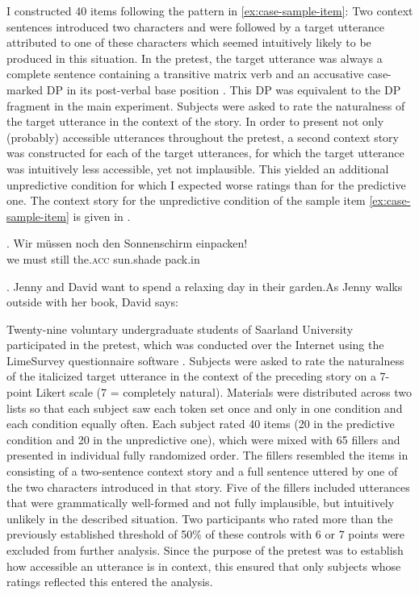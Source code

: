I constructed 40 items following the pattern in \ref{ex:case-sample-item}: Two context sentences introduced two characters and were followed by a target utterance attributed to one of these characters which seemed intuitively likely to be produced in this situation. In the pretest, the target utterance was always a complete sentence containing a transitive matrix verb and an accusative case-marked DP in its post-verbal base position \Next. This DP was equivalent to the DP fragment in the main experiment. Subjects were asked to rate the naturalness of the target utterance in the context of the story. In order to present not only (probably) accessible utterances throughout the pretest, a second context story was constructed for each of the target utterances, for which the target utterance was intuitively less accessible, yet not implausible. This yielded an additional unpredictive condition for which I expected worse ratings than for the predictive one. The context story for the unpredictive condition of the sample item \ref{ex:case-sample-item} is given in \NNext. 

\exg. Wir müssen noch den Sonnenschirm einpacken!\\ 
we must still the.\textsc{acc} sun.shade pack.in\\

\ex. Jenny and David want to spend a relaxing day in their garden.\linebreak As Jenny walks outside with her book, David says:

Twenty-nine voluntary undergraduate students of Saarland University participated in the pretest, which was conducted over the Internet using the LimeSurvey questionnaire software \citep{limesurveygmbh2012}. Subjects were asked to rate the naturalness of the italicized target utterance in the context of the preceding story on a 7-point Likert scale (7 = completely natural). Materials were distributed across two lists so that each subject saw each token set once and only in one condition and each condition equally often. Each subject rated 40 items (20 in the predictive condition and 20 in the unpredictive one), which were mixed with 65 fillers and presented in individual fully randomized order. The fillers resembled the items in consisting of a two-sentence context story and a full sentence uttered by one of the two characters introduced in that story. Five of the fillers included utterances that were grammatically well-formed and not fully implausible, but intuitively unlikely in the described situation. Two participants who rated more than the previously established threshold of 50\% of these controls with 6 or 7 points were excluded from further analysis. Since the purpose of the pretest was to establish how accessible an utterance is in context, this ensured that only subjects whose ratings reflected this entered the analysis.


